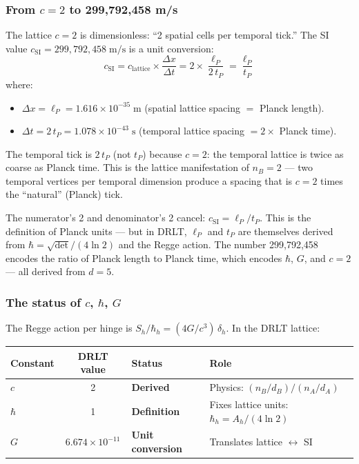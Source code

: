 \subsubsection{From $c = 2$ to 299{,}792{,}458 m/s}

The lattice $c = 2$ is dimensionless: ``2 spatial cells per temporal tick.'' The SI value $c_\text{SI} = 299{,}792{,}458\;\text{m/s}$ is a unit conversion:
\begin{equation}
c_\text{SI} = c_\text{lattice} \times \frac{\Delta x}{\Delta t} = 2 \times \frac{\ell_P}{2\,t_P} = \frac{\ell_P}{t_P}
\end{equation}
where:
\begin{itemize}
\item $\Delta x = \ell_P = 1.616 \times 10^{-35}\;\text{m}$ (spatial lattice spacing $=$ Planck length).
\item $\Delta t = 2\,t_P = 1.078 \times 10^{-43}\;\text{s}$ (temporal lattice spacing $= 2 \times$ Planck time).
\end{itemize}

The temporal tick is $2\,t_P$ (not $t_P$) because $c = 2$: the temporal lattice is twice as coarse as Planck time. This is the lattice manifestation of $n_B = 2$ --- two temporal vertices per temporal dimension produce a spacing that is $c = 2$ times the ``natural'' (Planck) tick.

The numerator's 2 and denominator's 2 cancel: $c_\text{SI} = \ell_P/t_P$. This is the definition of Planck units --- but in DRLT, $\ell_P$ and $t_P$ are themselves derived from $\hbar = \sqrt{\det}/(4\ln 2)$ and the Regge action. The number 299{,}792{,}458 encodes the ratio of Planck length to Planck time, which encodes $\hbar$, $G$, and $c = 2$ --- all derived from $d = 5$.

\subsubsection{The status of $c$, $\hbar$, $G$}

The Regge action per hinge is $S_h/\hbar_h = (4G/c^3)\,\delta_h$. In the DRLT lattice:

\begin{center}
\begin{tabular}{lcll}
\hline
Constant & DRLT value & Status & Role \\
\hline
$c$ & 2 & \textbf{Derived} & Physics: $(n_B/d_B)/(n_A/d_A)$ \\
$\hbar$ & 1 & \textbf{Definition} & Fixes lattice units: $\hbar_h = A_h/(4\ln 2)$ \\
$G$ & $6.674 \times 10^{-11}$ & \textbf{Unit conversion} & Translates lattice $\leftrightarrow$ SI \\
\hline
\end{tabular}
\end{center}

